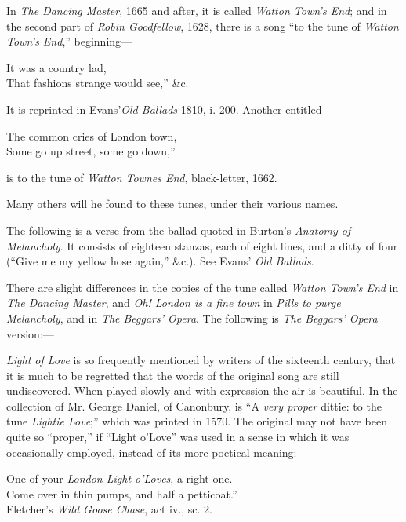 In \textit{The Dancing Master}, 1665 and after, it is called \textit{Watton Town’s End}; and
in the second part of \textit{Robin Goodfellow}, 1628, there is a song “to the tune of
\textit{Watton Town’s End},” beginning—
\begin{scverse}It was a country lad,\\
That fashions strange would see,” \&c.
\end{scverse}
It is reprinted in Evans’\textit{Old Ballads} 1810, i. 200. Another entitled—
\begin{scverse}The common cries of London town,\\
Some go up street, some go down,”
\end{scverse}
is to the tune of \textit{Watton Townes End}, black-letter, 1662.

Many others will he found to these tunes, under their various names.

The following is a verse from the ballad quoted in Burton’s \textit{Anatomy of
Melancholy}. It consists of eighteen stanzas, each of eight lines, and a ditty of
four (“Give me my yellow hose again,” \&c.). See Evans’ \textit{Old Ballads}.
\pagebreak



There are slight differences in the copies of the tune called \textit{Watton Town's End}
in \textit{The Dancing Master}, and \textit{Oh! London is a fine town} in \textit{Pills to purge Melancholy},
and in \textit{The Beggars’ Opera}. The following is \textit{The Beggars’ Opera} version:—



\pagebreak


\textit{Light of Love} is so frequently mentioned by writers of the sixteenth century,
that it is much to be regretted that the words of the original song are still
undiscovered. When played slowly and with expression the air is beautiful. In
the collection of Mr. George Daniel, of Canonbury, is “A \textit{very proper} dittie: to
the tune \textit{Lightie Love};” which was printed in 1570. The original may not have
been quite so “proper,” if “Light o’Love” was used in a sense in which it was
occasionally employed, instead of its more poetical meaning:—
\begin{scverse}
One of your \textit{London Light o'Loves}, a right one.\\
Come over in thin pumps, and half a petticoat.”\\
\attribution Fletcher’s \textit{Wild Goose Chase}, act iv., sc. 2.
\end{scverse}

